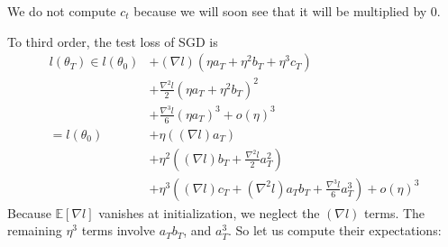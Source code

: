 \documentclass{article}
\newcommand{\expct}[1]{\mathbb{E}\left[#1\right]}
\newcommand{\wrap}[1]{\left(#1\right)}
\begin{document}
            We do not compute $c_t$ because we will soon see that it will be
            multiplied by $0$.

            To third order, the test loss of SGD is
            \begin{align*}
                l(\theta_T)
                \in
                        l(\theta_0)
                &+     (\nabla   l)   (\eta a_T + \eta^2 b_T + \eta^3 c_T)                              \\
                &+\frac{\nabla^2 l}{2}(\eta a_T + \eta^2 b_T             )^2                            \\
                &+\frac{\nabla^3 l}{6}(\eta a_T                          )^3 
                 +o(\eta)^3                                                                             \\
                =
                    l(\theta_0)
                &+  \eta       \wrap{(\nabla l) a_T                               }                     \\
                &+  \eta^2     \wrap{(\nabla l) b_T + \frac{\nabla^2 l}{2} a_T^2  }                     \\
                &+  \eta^3     \wrap{(\nabla l) c_T + (\nabla^2 l) a_T b_T + \frac{\nabla^3 l}{6} a_T^3}
                 +o(\eta)^3                                                                             
            \end{align*}
            Because $\expct{\nabla l}$ vanishes at initialization, we neglect
            the $(\nabla l)$ terms.  The remaining $\eta^3$ terms involve
            $a_T b_T$, and $a_T^3$.  So let us
            compute their expectations:
\end{document}
